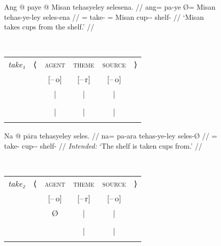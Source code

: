 \begin{figure}
\setlength{\tabcolsep}{.5ex}
\pex\label{ex:derargpass}
\a\label{ex:derargpass_1}%
\begin{minipage}[t]{.55\remaining}
\begingl
	\gla Ang @ paye {} @ Misan tehasyeley selesena. //
	\glb ang= pa-ye Ø= Misan tehas-ye-ley seles-ena //
	\glc \AgtT{}= take-\TsgF{} \Top{}= Misan cup-\Pl{}-\PargI{} shelf-\Gen{} //
	\glft `Misan takes cups from the shelf.' //
\endgl
\end{minipage}
~
\begin{tabular}[t]{>{\itshape}l l c c c r}
take₁
	& ⟨
	& \textsc{agent}
	& \textsc{theme}
	& \textsc{source}
	& ⟩
	\\
%
	& %
	& [–\,o]
	& [–\,r]
	& [–\,o]
	& %
	\\

%
	& %
	& |
	& |
	& |
	& %
	\\

%
	& %
	& \Subj*
	& \Obj
	& \Oblq{src}
	& %
	\\

%
	& %
	& |
	& |
	& |
	& %
	\\

%
	& %
	& \fw{Misan}
	& \fw{cups}
	& \fw{shelf}
	& %
	\\
\end{tabular}

\a\label{ex:derargpass_2}\ljudge*%
\begin{minipage}[t]{.55\remaining}%
\begingl
	\gla Na @ pāra tehasyeley seles. //
	\glb na= pa-ara tehas-ye-ley seles-Ø //
	\glc \GenT{}= take-\TsgI{} cup-\Pl{}-\PargI{} shelf-\Top{} //
	\glft \textit{Intended:} `The shelf is taken cups from.' //
\endgl
\end{minipage}
~
\begin{tabular}[t]{>{\itshape}l l c c c r}
take₂
	& ⟨
	& \textsc{agent}
	& \textsc{theme}
	& \textsc{source}
	& ⟩
	\\
%
	& %
	& [–\,o]
	& [–\,r]
	& [–\,o]
	& %
	\\

%
	& %
	& Ø
	& |
	& |
	& %
	\\

%
	& %
	& %
	& \Obj
	& \Subj*
	& %
	\\

%
	& %
	& %
	& |
	& |
	& %
	\\

%
	& %
	& %
	& \fw{cups}
	& \fw{shelf}
	& %
	\\
\end{tabular}


\end{figure}
